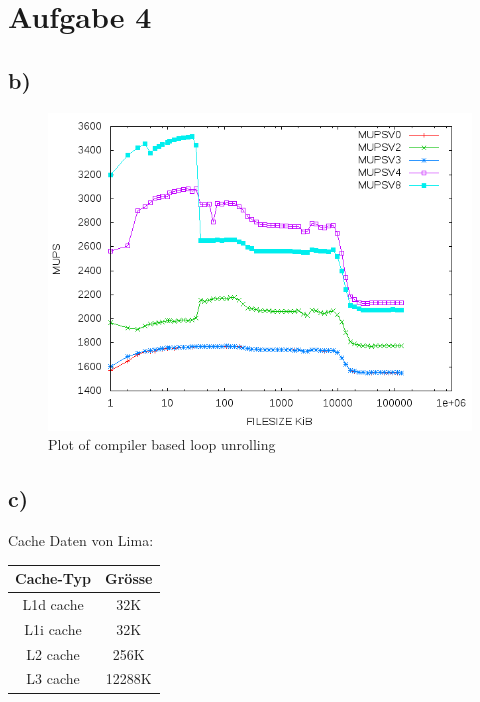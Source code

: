 \documentclass{article}
\begin{document}
\section*{Aufgabe 4}
\subsection*{b)}

\begin{center}
	\begin{figure}[h]
	\includegraphics[scale=0.6]{pics/a4b.png}
	\caption{Plot of compiler based loop unrolling}
	\end{figure}
\end{center}

\subsection*{c)}
Cache Daten von Lima:\\
\begin{center}
	\begin{tabular}{| c || c |}
		\hline
		Cache-Typ             & Gr\"osse \\
		\hline
		\hline
		L1d cache             &    32K\\
		\hline
		L1i cache             &    32K\\
		\hline
		L2 cache              &    256K\\
		\hline
		L3 cache              &    12288K\\
		\hline
	\end{tabular}
\end{center}
\end{document}
